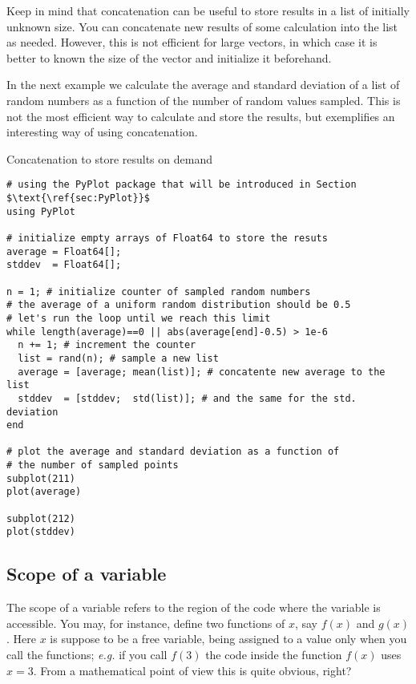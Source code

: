 Keep in mind that concatenation can be useful to store results in a list of initially unknown size. You can concatenate new results of some calculation into the list as needed. However, this is not efficient for large vectors, in which case it is better to known the size of the vector and initialize it beforehand.

In the next example we calculate the average and standard deviation of a list of random numbers as a function of the number of random values sampled. This is not the most efficient way to calculate and store the results, but exemplifies an interesting way of using concatenation.

\begin{example}{Concatenation to store results on demand}
\label{ex:concatenationstore}
\begin{verbatim}
# using the PyPlot package that will be introduced in Section $\text{\ref{sec:PyPlot}}$
using PyPlot 

# initialize empty arrays of Float64 to store the resuts
average = Float64[]; 
stddev  = Float64[];

n = 1; # initialize counter of sampled random numbers
# the average of a uniform random distribution should be 0.5
# let's run the loop until we reach this limit
while length(average)==0 || abs(average[end]-0.5) > 1e-6
  n += 1; # increment the counter
  list = rand(n); # sample a new list
  average = [average; mean(list)]; # concatente new average to the list
  stddev  = [stddev;  std(list)]; # and the same for the std. deviation
end

# plot the average and standard deviation as a function of 
# the number of sampled points
subplot(211)
plot(average)

subplot(212)
plot(stddev)
\end{verbatim}
\end{example}



\subsection{Scope of a variable}

The scope of a variable refers to the region of the code where the variable is accessible. You may, for instance, define two functions of $x$, say $f(x)$ and $g(x)$. Here $x$ is suppose to be a free variable, being assigned to a value only when you call the functions; \textit{e.g.} if you call $f(3)$ the code inside the function $f(x)$ uses $x=3$. From a mathematical point of view this is quite obvious, right?

